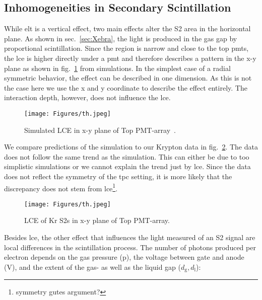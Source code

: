 
\FloatBarrier
\subsection{Inhomogeneities in Secondary Scintillation}
\label{ssec:scint-inhomo}
\FloatBarrier


While \gls{elt} is a vertical effect, two main effects alter the S2 area in the horizontal plane.
As shown in sec.~\ref{sec:Xebra}, the light is produced in the gas gap by proportional scintillation.
Since the region is narrow and close to the top \glspl{pmt}, the \gls{lce} is higher directly under a \gls{pmt} and therefore describes a pattern in the x-y plane as shown in fig.~\ref{fig:lce-xy-sim-alex} from simulations.
In the simplest case of a radial symmetric behavior, the effect can be described in one dimension.
As this is not the case here we use the x and y coordinate to describe the effect entirely.
The interaction depth, however, does not influence the \gls{lce}.

\begin{figure}
    \centering
    \texttt{[image: Figures/th.jpeg]}  %
    \caption[Simulated LCE in x-y plane of Top PMT-array]{
        Simulated LCE in x-y plane of Top PMT-array~\cite{ABism}.
    }
    \label{fig:lce-xy-sim-alex}
\end{figure}

We compare predictions of the simulation to our Krypton data in fig.~\ref{fig:S2-lce-x-y-krypton}.  %
The data does not follow the same trend as the simulation.
This can either be due to too simplistic simulations or we cannot explain the trend just by \gls{lce}.
Since the data does not reflect the symmetry of the \gls{tpc} setting, it is more likely that the discrepancy does not stem from \gls{lce}\footnote{symmetry gutes argument?}.

\begin{figure}
    \centering
    \texttt{[image: Figures/th.jpeg]}  %
    \caption[LCE of Kr S2s in x-y plane of Top PMT-array]{
        LCE of Kr S2s in x-y plane of Top PMT-array.
    }
    \label{fig:S2-lce-x-y-krypton}
\end{figure}

Besides \gls{lce}, the other effect that influences the light measured of an S2 signal are local differences in the scintillation process.
The number of photons produced per electron depends on the gas pressure (p), the voltage between gate and anode (V), and the extent of the gas- as well as the liquid gap ($ d_\mathrm{g}, d_\mathrm{l}$):

